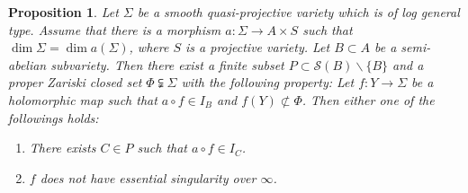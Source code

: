 \documentclass[11pt,english]{smfart}
\theoremstyle{plain}
\newtheorem{proposition}[thm]{Proposition}
\theoremstyle{definition}
\theoremstyle{remark}
\numberwithin{equation}{section}
\theoremstyle{plain}
\begin{document}
	
	
	
	
	
	
	
	
	
	
	
	
	
	
	
	
	
	
	
	
	
	
	
	
	
	
	
	
	
	
	
	
	
	
	\begin{proposition}\label{prop:20220902}
		Let $\Sigma$ be a smooth quasi-projective variety which is of log general type.
		Assume that there is a morphism $a:\Sigma\to A\times S$ such that $\dim \Sigma=\dim a(\Sigma)$, where $S$ is a projective variety.
		Let $B\subset A$ be a semi-abelian subvariety.
		Then there exist a finite subset $P\subset \mathcal{S}(B)\backslash\{B\}$ and a proper Zariski closed set $\Phi\subsetneqq \Sigma$ with the following property:
		Let $f:Y\to \Sigma$ be a holomorphic map such that $a\circ f\in I_B$ and $f(Y)\not\subset \Phi$. 
		Then either one of the followings holds:
		\begin{enumerate}
			\item
			There exists $C\in P$ such that $a\circ f\in I_C$.
			\item
			$f$ does not have essential singularity over $\infty$.
		\end{enumerate}
	\end{proposition}
	
\end{document}
